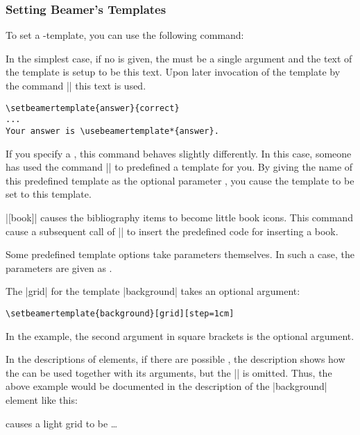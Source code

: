 \subsubsection{Setting Beamer's Templates}

To set  a \beamer-template, you can use the following command:

\begin{command}{\setbeamertemplate{}}
  In the simplest case, if no  is given, the
   must be a single argument and the text of the template
   is setup to be this text. Upon later invocation
  of the template by the command |\usebeamertemplate| this text is
  used. 

  \example
\begin{verbatim}
\setbeamertemplate{answer}{correct}
...
Your answer is \usebeamertemplate*{answer}.
\end{verbatim}

  If you specify a , this command behaves
  slightly differently. In this case, someone has used the command
  || to predefined a template for you. By giving the
  name of this predefined template as the optional parameter
  , you cause the template 
  to be set to this template.

  \example |[book]| causes the
  bibliography items to become little book icons. This command cause a
  subsequent call of || to insert
  the predefined code for inserting a book.

  Some predefined template options take parameters themselves. In such
  a case, the parameters are given as .

  \example
  The  |grid| for the template |background|
  takes an optional argument:
\begin{verbatim}
\setbeamertemplate{background}[grid][step=1cm]
\end{verbatim}
  In the example, the second argument in square brackets is the
  optional argument.

  In the descriptions of elements, if there are possible
  , the description shows how the
   can be used together with its arguments,
  but the || is omitted. Thus, the above
  example would be documented in the description of the |background|
  element like this:
  \begin{itemize}
     causes a light grid to be
    \dots
  \end{itemize}
\end{command}

